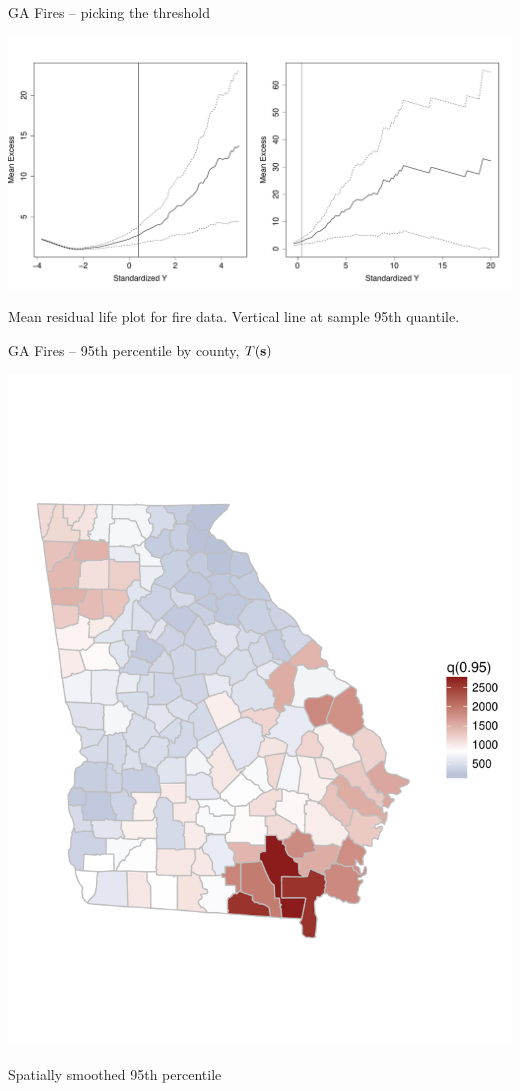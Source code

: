 \documentclass{beamer}
\begin{document}
\begin{frame}{GA Fires -- picking the threshold}
	\begin{center}
		\includegraphics[width=1\textwidth]{fire-mrl-plots}
		
		Mean residual life plot for fire data. Vertical line at sample 95th quantile.
	\end{center}
\end{frame}

\begin{frame}{GA Fires -- 95th percentile by county, $T(\mathbf{s})$}\vspace{-35pt}
	\begin{center}
		\includegraphics[height=0.95\textheight]{fire-spatial-q95}
		\vspace{-3em}
		
		Spatially smoothed 95th percentile
	\end{center}
\end{frame}
\end{document}
